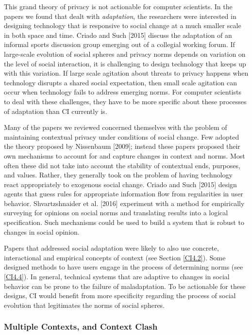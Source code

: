 \documentclass[../thesis.tex]{subfiles}
\begin{document}
This grand theory of privacy is not actionable for computer scientists.
In the papers we found that dealt with \textit{adaptation}, the
researchers were interested in designing technology that is responsive
to social change at a much smaller scale in both space and time. Criado
and Such [2015] discuss the adaptation of an informal sports discussion
group emerging out of a collegial working forum. If large-scale
evolution of social spheres and privacy norms depends on variation on
the level of social interaction, it is challenging to design technology
that keeps up with this variation. If large scale agitation about
threats to privacy happens when technology disrupts a shared social
expectation, then small scale agitation can occur when technology fails
to address emerging norms. For computer scientists to deal with these
challenges, they have to be more specific about these processes of
adaptation than CI currently is.

Many of the papers we reviewed concerned themselves with the problem of
maintaining contextual privacy under conditions of social change. Few
adopted the theory proposed by Nissenbaum [2009]; instead these papers
proposed their own mechanisms to account for and capture changes in
context and norms. Most often these did not take into account the
stability of contextual ends, purposes, and values. Rather, they
generally took on the problem of having technology react appropriately
to exogenous social change. Criado and Such [2015] design agents that
guess rules for appropriate information flow from regularities in user
behavior. Shvartzshnaider et al. [2016] experiment with a method for
empirically surveying for opinions on social norms and translating
results into a logical specification. Such mechanisms could be used to
build a system that is robust to changes in social opinion.

Papers that addressed social adaptation were likely to also use
concrete, interactional and empirical concepts of context (see Section
\ref{CI4.2}). Some designed methods to have users engage in the process of
determining norms (see \ref{CI4.4}). In general, technical systems that are
adaptive to changes in social behavior can be prone to the failure of
maladaptation. To be actionable for these designs, CI would benefit
from more specificity regarding the process of social evolution that
legitimates the norms of social spheres.

\subsubsection{Multiple Contexts, and Context Clash}
\label{CI4.4.2}
\end{document}
